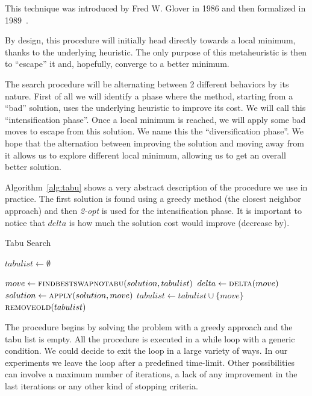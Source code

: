 \documentclass{article}
\begin{document}
This technique was introduced by Fred W. Glover in 1986 and then formalized
in 1989~\cite{Glover:TabuSearch}.

By design, this procedure will initially head directly towards a local minimum, thanks to the underlying heuristic. The only purpose of this metaheuristic is then to ``escape'' it and, hopefully, converge to a better minimum.

The search procedure will be alternating between 2 different behaviors by its nature. First of all
we will identify a phase where the method, starting from a ``bad'' solution, uses the underlying
heuristic to improve its cost. We will call this ``intensification phase''. Once a local minimum is reached, we will apply some bad moves to escape from this solution. We name this the ``diversification phase''. We hope that the alternation between improving the solution and moving
away from it allows us to explore different local minimum, allowing us to get an overall better
solution.

Algorithm~\ref{alg:tabu} shows a very abstract description of the procedure we use in practice. The first solution is found using a greedy method (the closest neighbor approach) and then \textit{2-opt} is used for the intensification phase. It is important to notice that $delta$ is
how much the solution cost would improve (decrease by).

\begin{algorithm}[ht]
\caption{Tabu Search}
\label{alg:tabu}
\begin{algorithmic}
    \State{}
    \State $tabulist \gets \emptyset$

        \State $move \gets \Call{findbestswapnotabu}{solution, tabulist}$
        \State $delta \gets \Call{delta}{move}$
        \State $solution \gets \Call{apply}{solution, move}$
          \State $tabulist \gets tabulist \cup \{move\}$
        \EndIf
        \State $\Call{removeold}{tabulist}$
    \EndWhile

  \EndProcedure

\end{algorithmic}
\end{algorithm}

The procedure begins by solving the problem with a greedy approach and the tabu list
is empty. All the procedure is executed in a while loop with a generic condition. We could
decide to exit the loop in a large variety of ways. In our experiments we leave the loop
after a predefined time-limit. Other possibilities can involve a maximum number of iterations, a lack of any improvement in the last iterations or any other kind of stopping criteria.
\end{document}
